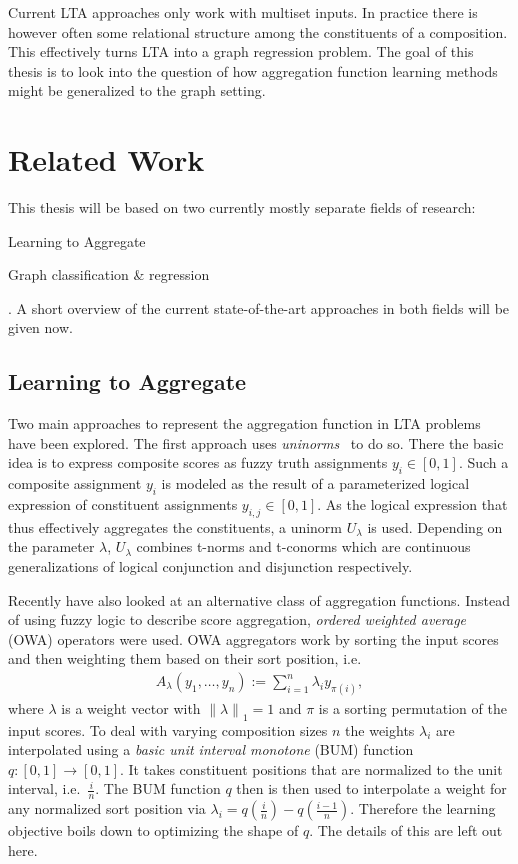 \documentclass[12pt]{scrartcl}
\begin{document}
Current LTA approaches only work with multiset inputs.
In practice there is however often some relational structure among the constituents of a composition.
This effectively turns LTA into a graph regression problem.
The goal of this thesis is to look into the question of how aggregation function learning methods might be generalized to the graph setting.

\section{Related Work}%
\label{sec:related-work}

This thesis will be based on two currently mostly separate fields of research:
\begin{enumerate*}[label=\textbf{\arabic*.}]
	\item Learning to Aggregate
	\item Graph classification \& regression
\end{enumerate*}.
A short overview of the current state-of-the-art approaches in both fields will be given now.

\subsection{Learning to Aggregate}%
\label{sec:related-work:lta}

Two main approaches to represent the aggregation function in LTA problems have been explored.
The first approach uses \textit{uninorms}~\cite{Melnikov2016} to do so.
There the basic idea is to express composite scores as fuzzy truth assignments $y_i \in [0, 1]$.
Such a composite assignment $y_i$ is modeled as the result of a parameterized logical expression of constituent assignments $y_{i,j} \in [0, 1]$.
As the logical expression that thus effectively aggregates the constituents, a uninorm $U_{\lambda}$ is used.
Depending on the parameter $\lambda$, $U_{\lambda}$ combines t-norms and t-conorms which are continuous generalizations of logical conjunction and disjunction respectively.

Recently \citet{Melnikov2019} have also looked at an alternative class of aggregation functions.
Instead of using fuzzy logic to describe score aggregation, \textit{ordered weighted average} (OWA) operators were used.
OWA aggregators work by sorting the input scores and then weighting them based on their sort position, i.e.\ %
\begin{align*}
	A_{\lambda}(y_1, \dots, y_n) := \sum_{i = 1}^n \lambda_i y_{\pi(i)},
\end{align*}
where $\lambda$ is a weight vector with ${\|\lambda\|}_1 = 1$ and $\pi$ is a sorting permutation of the input scores. %
To deal with varying composition sizes $n$ the weights $\lambda_i$ are interpolated using a \textit{basic unit interval monotone} (BUM) function $q: [0, 1] \to [0, 1]$.
It takes constituent positions that are normalized to the unit interval, i.e.\ $\frac{i}{n}$.
The BUM function $q$ then is then used to interpolate a weight for any normalized sort position via $\lambda_i = q(\frac{i}{n}) - q(\frac{i - 1}{n})$.
Therefore the learning objective boils down to optimizing the shape of $q$.
The details of this are left out here.
\end{document}
